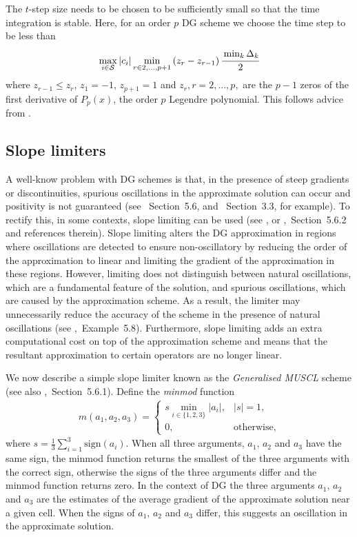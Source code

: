 The \(t\)-step size needs to be chosen to be sufficiently small so that the time integration is stable. Here, for an order \(p\) DG scheme we choose the time step to be less than 
\[\max_{i\in\mathcal{S}}|c_i|\min_{r\in{2,...,p+1}}\left(z_{r}-z_{r-1}\right) \cfrac{\min_{k}{\Delta}_k}{2}\]
where \(z_{r-1}\leq z_r\), \(z_1=-1\), \(z_{p+1}=1\) and \(z_r, r=2,...,p,\) are the \(p-1\) zeros of the first derivative of \(P_{p}(x)\), the order \(p\) Legendre polynomial. This follows advice from \cite{nodalDGBook}. 

\subsection{Slope limiters}\label{sec: slope limiting}
A well-know problem with DG schemes is that, in the presence of steep gradients or discontinuities, spurious oscillations in the approximate solution can occur and positivity is not guaranteed (see \cite{nodalDGBook}~Section~5.6, and \cite{koltai2011}~Section~3.3, for example). To rectify this, in some contexts, slope limiting can be used (see \cite{c99}, or \cite{nodalDGBook},~Section~5.6.2 and references therein). Slope limiting alters the DG approximation in regions where oscillations are detected to ensure non-oscillatory by reducing the order of the approximation to linear and limiting the gradient of the approximation in these regions. However, limiting does not distinguish between natural oscillations, which are a fundamental feature of the solution, and spurious oscillations, which are caused by the approximation scheme. As a result, the limiter may unnecessarily reduce the accuracy of the scheme in the presence of natural oscillations (see \citep{nodalDGBook},~Example~5.8). Furthermore, slope limiting adds an extra computational cost on top of the approximation scheme and means that the resultant approximation to certain operators are no longer linear.

We now describe a simple slope limiter known as the \emph{Generalised MUSCL} scheme \citep{c99} (see also \citep{nodalDGBook},~Section~5.6.1). Define the \emph{minmod} function 
\begin{align*}
	m(a_1,a_2,a_3)=\begin{cases}
		s\min_{i\in\{1,2,3\}}|a_i|, & |s|=1, \\
		0, &\mbox{otherwise},
	\end{cases}
\end{align*}
where \(s=\frac{1}{3}\sum\limits_{i=1}^{3}\mbox{sign}(a_i)\). When all three arguments, \(a_1,\,a_2\) and \(a_3\) have the same sign, the minmod function returns the smallest of the three arguments with the correct sign, otherwise the signs of the three arguments differ and the minmod function returns zero. In the context of DG the three arguments \(a_1,\,a_2\) and \(a_3\) are the estimates of the average gradient of the approximate solution near a given cell. When the signs of \(a_1,\,a_2\) and \(a_3\) differ, this suggests an oscillation in the approximate solution. 


